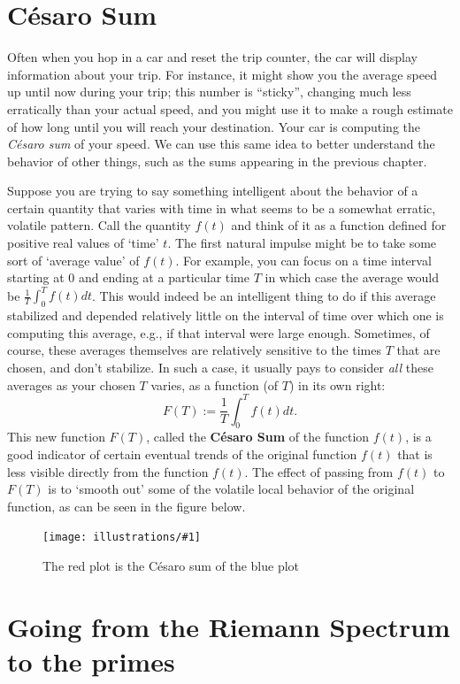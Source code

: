 \documentclass[openany]{book}
\newcommand{\ill}[3]{%
   \begin{figure}[H]%
   \vspace{-2ex}
   \centering%
   \texttt{[image: illustrations/\#1]}%
   \caption{#3}%
   \vspace{-2ex}
    \end{figure}}
\theoremstyle{plain}
\theoremstyle{definition}
\begin{document}
\chapter {C{\'e}saro Sum}

Often when you hop in a car and reset the trip counter, the car
will display information about your trip.  For instance, it might show you the
average speed up until now during your trip; this number
is ``sticky'', changing much less erratically than your
actual speed, and you might use it to make a rough estimate of
how long until you will reach your destination.
Your car is computing the {\em C{\'e}saro sum }of your speed.
We can use this same idea to better understand the behavior
of other things, such as the sums appearing in
the previous chapter.

 Suppose you are trying to say something intelligent about the behavior of a certain quantity that varies with time in what seems to be a somewhat erratic, volatile pattern. Call the quantity $f(t)$ and think of it as a function defined for positive real values of `time' $t$.  The first natural impulse might be to take some sort of `average value' of  $f(t)$.  For example, you can focus on a time interval starting at $0$ and ending at a particular time $T$ in which case the average would be ${\frac{1}{T}}\int_0^Tf(t)dt$.   This would indeed be an intelligent thing to do if this average stabilized and depended relatively little on  the interval of time over which one is computing this average, e.g., if that interval were large enough.  Sometimes, of course, these averages themselves are relatively sensitive to the times $T$ that are chosen, and don't stabilize. In such a case, it usually pays to consider {\it all} these averages  as  your chosen $T$ varies, as a function (of $T$) in its own right:
  $$F(T):= {\frac{1}{T}}\int_0^Tf(t)dt.$$
   This new function $F(T)$, called the {\bf C{\'e}saro Sum} of the function $f(t)$, is a good indicator of certain eventual trends of the original function $f(t)$ that is less visible directly from the function $f(t)$.  The effect of passing from $f(t)$ to $F(T)$ is to `smooth out' some of the volatile local behavior of the original function, as can be seen in the figure below.


\ill{cesaro}{.8}{The red plot is the C{\'e}saro sum of the blue plot}






\chapter{Going from the Riemann Spectrum to the primes}
\end{document}
